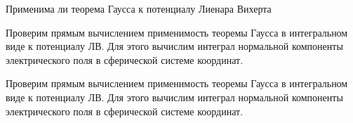 \documentclass{article}
\begin{document}
\pagestyle{empty}
\begin{Maple Normal}{
\begin{Maple Normal}{
}\end{Maple Normal}
}\end{Maple Normal}
\begin{Maple Normal}{
\begin{Maple Normal}{
Применима ли теорема Гаусса к потенциалу Лиенара Вихерта}\end{Maple Normal}

}\end{Maple Normal}

\begin{Maple Normal}{
\begin{Maple Normal}{
}\end{Maple Normal}
}\end{Maple Normal}
\begin{Maple Normal}{
\begin{Maple Normal}{
Проверим прямым вычислением применимость теоремы Гаусса в интегральном виде к потенциалу ЛВ. Для этого вычислим интеграл нормальной компоненты электрического поля в сферической системе координат.}\end{Maple Normal}

\begin{Maple Normal}{
Проверим прямым вычислением применимость теоремы Гаусса в интегральном виде к потенциалу ЛВ. Для этого вычислим интеграл нормальной компоненты электрического поля в сферической системе координат.}\end{Maple Normal}

}\end{Maple Normal}
\end{document}
